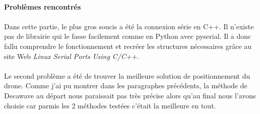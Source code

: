             \begin{table}[H]
                \caption{\label{table:resMoyens}Résultats moyens obtenus avec Bancroft et Decawave}
            \end{table}
            
        
        \paragraph{Problèmes rencontrés}
            \paragraph*{}
            Dans cette partie, le plus gros soucis a été la connexion série en C++. Il n'existe pas de librairie qui le fasse facilement comme en Python avec pyserial. Il a donc fallu comprendre le fonctionnement et recréer les structures nécessaires grâce au site Web \textit{Linux Serial Ports Using C/C++}\cite{portSerieCpp}.
            
            
            \paragraph*{}
            Le second problème a été de trouver la meilleure solution de positionnement du drone. Comme j'ai pu montrer dans les paragraphes précédents, la méthode de Decawave au départ nous paraissait pas très précise alors qu'au final nous l'avons choisie car parmis les 2 méthodes testées c'était la meilleure en tout.
    
